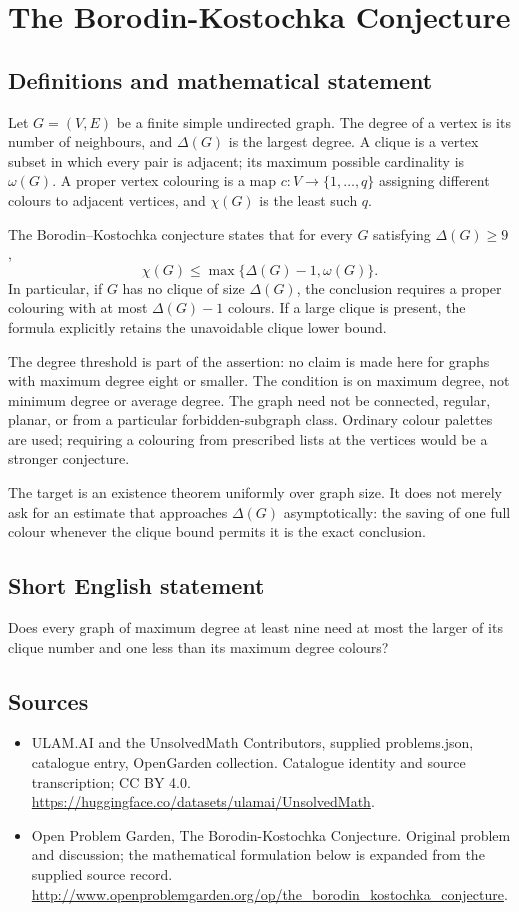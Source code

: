 \documentclass[11pt,a4paper]{article}
\begin{document}
\section*{The Borodin-Kostochka Conjecture}\label{statement}

\subsection{Definitions and mathematical statement}
Let $G=(V,E)$ be a finite simple undirected graph. The degree of a
vertex is its number of neighbours, and $\Delta(G)$ is the largest
degree. A clique is a vertex subset in which every pair is adjacent;
its maximum possible cardinality is $\omega(G)$.
A proper vertex colouring is a map $c:V\to\{1,\ldots,q\}$ assigning
different colours to adjacent vertices, and $\chi(G)$ is the least
such $q$.

The Borodin--Kostochka conjecture states that for every $G$ satisfying
$\Delta(G)\ge9$,
\[
 \chi(G)\le\max\{\Delta(G)-1,\omega(G)\}.
\]
In particular, if $G$ has no clique of size $\Delta(G)$, the conclusion
requires a proper colouring with at most $\Delta(G)-1$ colours. If a
large clique is present, the formula explicitly retains the unavoidable
clique lower bound.

The degree threshold is part of the assertion: no claim is made here
for graphs with maximum degree eight or smaller. The condition is on
maximum degree, not minimum degree or average degree. The graph need
not be connected, regular, planar, or from a particular forbidden-subgraph
class. Ordinary colour palettes are used; requiring a colouring from
prescribed lists at the vertices would be a stronger conjecture.

The target is an existence theorem uniformly over graph size. It does
not merely ask for an estimate that approaches $\Delta(G)$ asymptotically:
the saving of one full colour whenever the clique bound permits it is
the exact conclusion.
\subsection{Short English statement}
Does every graph of maximum degree at least nine need at most the larger of its clique number and one less than its maximum degree colours?
\subsection{Sources}
\begin{itemize}
\item[S1] ULAM.AI and the UnsolvedMath Contributors, supplied problems.json, catalogue entry, OpenGarden collection. Catalogue identity and source transcription; CC BY 4.0.
\url{https://huggingface.co/datasets/ulamai/UnsolvedMath}.
\item[S2] Open Problem Garden, The Borodin-Kostochka Conjecture. Original problem and discussion; the mathematical formulation below is expanded from the supplied source record.
\url{http://www.openproblemgarden.org/op/the_borodin_kostochka_conjecture}.
\end{itemize}
\end{document}
